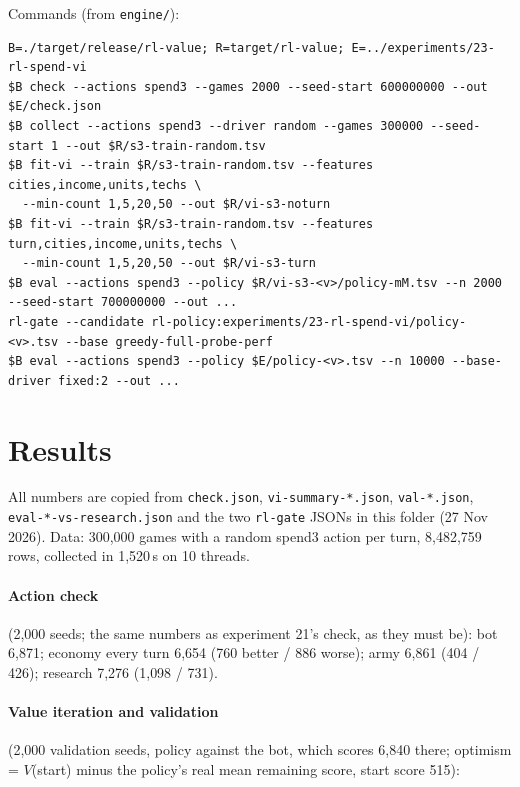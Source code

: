 \documentclass{../polyexp}
\begin{document}
Commands (from \texttt{engine/}):
\begin{verbatim}
B=./target/release/rl-value; R=target/rl-value; E=../experiments/23-rl-spend-vi
$B check --actions spend3 --games 2000 --seed-start 600000000 --out $E/check.json
$B collect --actions spend3 --driver random --games 300000 --seed-start 1 --out $R/s3-train-random.tsv
$B fit-vi --train $R/s3-train-random.tsv --features cities,income,units,techs \
  --min-count 1,5,20,50 --out $R/vi-s3-noturn
$B fit-vi --train $R/s3-train-random.tsv --features turn,cities,income,units,techs \
  --min-count 1,5,20,50 --out $R/vi-s3-turn
$B eval --actions spend3 --policy $R/vi-s3-<v>/policy-mM.tsv --n 2000 --seed-start 700000000 --out ...
rl-gate --candidate rl-policy:experiments/23-rl-spend-vi/policy-<v>.tsv --base greedy-full-probe-perf
$B eval --actions spend3 --policy $E/policy-<v>.tsv --n 10000 --base-driver fixed:2 --out ...
\end{verbatim}

\section{Results}
\ExpResults

All numbers are copied from \texttt{check.json}, \texttt{vi-summary-*.json}, \texttt{val-*.json},
\texttt{eval-*-vs-research.json} and the two \texttt{rl-gate} JSONs in this folder (27 Nov 2026). Data: 300{,}000
games with a random spend3 action per turn, 8{,}482{,}759 rows, collected in 1{,}520\,s on 10 threads.

\paragraph{Action check} (2{,}000 seeds; the same numbers as experiment 21's check, as they must be): bot 6{,}871;
economy every turn 6{,}654 (760 better / 886 worse); army 6{,}861 (404 / 426); research 7{,}276 (1{,}098 / 731).

\paragraph{Value iteration and validation} (2{,}000 validation seeds, policy against the bot, which scores 6{,}840
there; optimism = $V$(start) minus the policy's real mean remaining score, start score 515):
\end{document}
